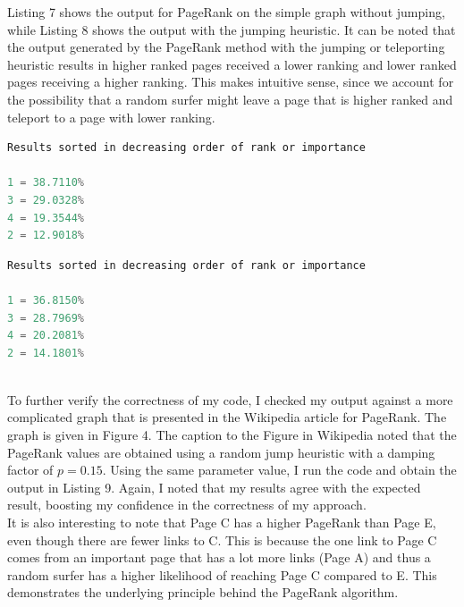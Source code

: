 \documentclass[9.5pt]{extarticle}
\begin{document}
Listing 7 shows the output for PageRank on the simple graph without jumping, while Listing 8 shows the output with the jumping heuristic. It can be noted that the output generated by the PageRank method with the jumping or teleporting heuristic results in higher ranked pages received a lower ranking and lower ranked pages receiving a higher ranking. This makes intuitive sense, since we account for the possibility that a random surfer might leave a page that is higher ranked and teleport to a page with lower ranking.\\

\begin{lstlisting}[language=java,caption={Output for PageRank on simple graph without jumping}]
Results sorted in decreasing order of rank or importance

1 = 38.7110%
3 = 29.0328%
4 = 19.3544%
2 = 12.9018%

\end{lstlisting}

\begin{lstlisting}[language=java,caption={Output for PageRank on simple graph with jumping}]
Results sorted in decreasing order of rank or importance

1 = 36.8150%
3 = 28.7969%
4 = 20.2081%
2 = 14.1801%

\end{lstlisting}
~\\

To further verify the correctness of my code, I checked my output against a more complicated graph that is presented in the Wikipedia article for PageRank. The graph is given in Figure 4. The caption to the Figure in Wikipedia noted that the PageRank values are obtained using a random jump heuristic with a damping factor of $p = 0.15$. Using the same parameter value, I run the code and obtain the output in Listing 9. Again, I noted that my results agree with the expected result, boosting my confidence in the correctness of my approach.\\

It is also interesting to note that Page C has a higher PageRank than Page E, even though there are fewer links to C. This is because the one link to Page C comes from an important page that has a lot more links (Page A) and thus a random surfer has a higher likelihood of reaching Page C compared to E. This demonstrates the underlying principle behind the PageRank algorithm.\\
\end{document}
